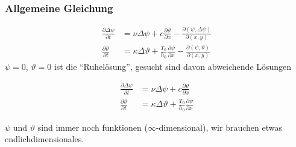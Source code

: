 %
%
\begin{frame}
\frametitle{Allgemeine Gleichung}
\begin{align*}
\frac{\partial \Delta \psi}{\partial t}
&=
\nu \Delta \psi + c\frac{\partial \vartheta}{\partial x}
-\frac{\partial(\psi,\Delta\psi)}{\partial(x,y)}
\\
\frac{\partial \vartheta}{\partial t}
&=
\kappa\Delta \vartheta
+
\frac{T_0}{h_0}\frac{\partial \psi}{\partial x}
-\frac{\partial(\psi,\vartheta)}{\partial(x,y)}
\end{align*}
$\psi=0$, $\vartheta=0$ ist die ``Ruhelösung'', gesucht sind
davon abweichende Lösungen
\begin{lin}
\vspace{-10pt}
\begin{align*}
\frac{\partial \Delta \psi}{\partial t}
&=
\nu \Delta \psi + c\frac{\partial \vartheta}{\partial x}
\\
\frac{\partial \vartheta}{\partial t}
&=
\kappa\Delta \vartheta
+
\frac{T_0}{h_0}\frac{\partial \psi}{\partial x}
\end{align*}
\vspace{-10pt}
\end{lin}
\begin{prob}
$\psi$ und $\vartheta$ sind immer noch funktionen ($\infty$-dimensional),
wir brauchen etwas endlichdimensionales.
\end{prob}
\end{frame}

